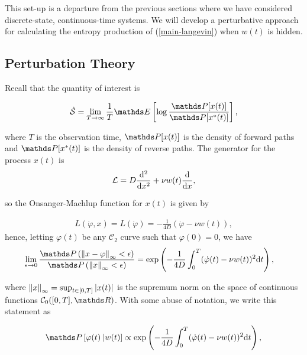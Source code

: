 This set-up is a departure from the previous sections where we have considered discrete-state, continuous-time systems. We will develop a perturbative approach for calculating the entropy production of (\ref{main-langevin}) when $w(t)$ is hidden. 

\subsection{Perturbation Theory}\label{methods}

Recall that the quantity of interest is 

\begin{align}
\entpp = \lim_{T\rightarrow \infty}\frac{1}{T}\bE \left [\log \frac{\bP[x(t)]}{\bP[x^\ast(t)]} \right],
\end{align}

where $T$ is the observation time, $\bP[x(t)]$ is the density of forward paths and $\bP[x^\ast(t)]$ is the density of reverse paths. The generator for the process $x(t)$ is 
\begin{align}
\mathcal{L} = D \frac{\mathrm{d}^2}{\mathrm{d} x^2} + \nu w(t)\frac{\mathrm{d}}{\mathrm{d} x}, 
\end{align}

so the Onsanger-Machlup function for $x(t)$ is given by \cite{capitaine1995onsager}\cite[see Chapter VI, Section 9]{ikeda1989stochastic}

\begin{align}
L(\dot{\varphi},x) = L(\dot{\varphi}) = -\frac{1}{4D}(\dot{\varphi}-\nu w(t)),
\end{align}
hence, letting $\varphi(t)$ be any $\mathcal{C}_2$ curve such that $\varphi(0) = 0$, we have
\begin{align}
 \lim_{\epsilon \rightarrow 0} \frac{\bP\left (\norm{x - \varphi}_\infty < \epsilon  \right)}{\bP\left (\norm{x}_\infty < \epsilon  \right)} &= \exp \left (-\frac{1}{4D} \int_0^T (\dot{\varphi}(t)-\nu w(t))^2 \rmd t \right) ,
\end{align}

where $\norm{x}_\infty = \sup_{t \in [0,T]}\abs{x(t)}$ is the supremum norm on the space of continuous functions $\mathcal{C}_0([0,T], \bR)$. With some abuse of notation, we write this statement as 

\begin{align}\label{varphi-cond-prob}
\bP\left [\varphi(t)\: \lvert w(t) \right] \propto \exp \left (-\frac{1}{4D} \int_0^T (\dot{\varphi}(t) - \nu w(t))^2 \rmd t \right),
\end{align}

